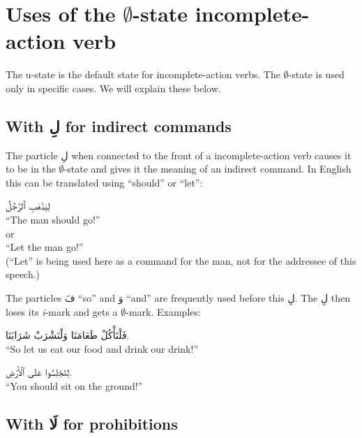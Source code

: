 \documentclass[
  10pt,
]{book}
\begin{document}
\section{\texorpdfstring{Uses of the \(\emptyset\)-state incomplete-action verb}{Uses of the \textbackslash emptyset-state incomplete-action verb}}\label{uses-of-the-emptyset-state-incomplete-action-verb}

The u-state is the default state for incomplete-action verbs. The
\(\emptyset\)-state
is used only in specific cases. We will explain these below.

\subsection{\texorpdfstring{With \foreignlanguage{arabic}{لِ} for indirect commands}{With لِ for indirect commands}}\label{with-ux644-for-indirect-commands}

The particle \foreignlanguage{arabic}{لِ} when connected to the front of a
incomplete-action verb
causes it to be in the
\(\emptyset\)-state
and gives it the meaning of an indirect command. In English this can be translated using \enquote{should} or \enquote{let}:

\foreignlanguage{arabic}{لِيَذْهَبِ ٱَلرَّجُلُ}\\
\enquote{The man should go!}\\
or\\
\enquote{Let the man go!}\\
(\enquote{Let} is being used here as a command for the man, not for the addressee of this speech.)

The particles \foreignlanguage{arabic}{فَ} \enquote{so} and \foreignlanguage{arabic}{وَ} \enquote{and} are frequently used before this \foreignlanguage{arabic}{لِ}.
The \foreignlanguage{arabic}{لِ} then loses its \emph{i}-mark and gets a
\(\emptyset\)-mark. Examples:

\foreignlanguage{arabic}{فَلْنَأْکُلْ طَعَامَنَا وَلْنَشْرَبْ شَرَابَنَا.}\\
\enquote{So let us eat our food and drink our drink!}

\foreignlanguage{arabic}{لِتَجْلِسُوا عَلَى ٱلْأَرْضِ.}\\
\enquote{You should sit on the ground!}

\subsection{\texorpdfstring{With \foreignlanguage{arabic}{لَا} for prohibitions}{With لَا for prohibitions}}\label{la-of-prohibition}
\end{document}
